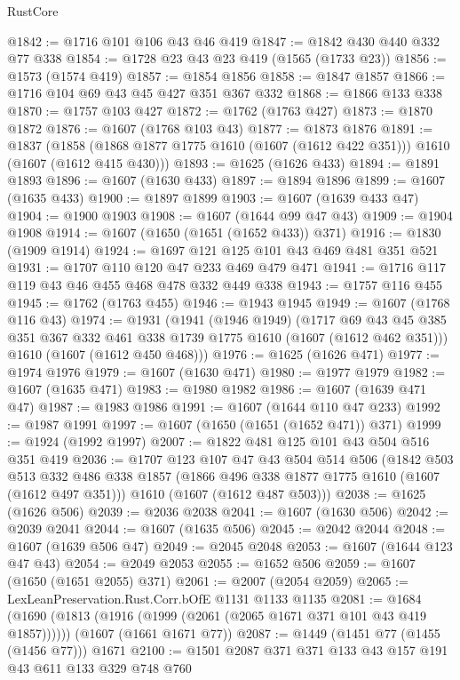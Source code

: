 \begin{lexlean}{RustCore}
\begin{coremodule}
@1842 := @1716 @101 @106 @43 @46 @419
@1847 := @1842 @430 @440 @332 @77 @338
@1854 := @1728 @23 @43 @23 @419 (@1565 (@1733 @23))
@1856 := @1573 (@1574 @419)
@1857 := @1854 @1856
@1858 := @1847 @1857
@1866 := @1716 @104 @69 @43 @45 @427 @351 @367 @332
@1868 := @1866 @133 @338
@1870 := @1757 @103 @427
@1872 := @1762 (@1763 @427)
@1873 := @1870 @1872
@1876 := @1607 (@1768 @103 @43)
@1877 := @1873 @1876
@1891 := @1837
    (@1858 (@1868 @1877 @1775 @1610 (@1607 (@1612 @422 @351))) @1610 (@1607 (@1612 @415 @430)))
@1893 := @1625 (@1626 @433)
@1894 := @1891 @1893
@1896 := @1607 (@1630 @433)
@1897 := @1894 @1896
@1899 := @1607 (@1635 @433)
@1900 := @1897 @1899
@1903 := @1607 (@1639 @433 @47)
@1904 := @1900 @1903
@1908 := @1607 (@1644 @99 @47 @43)
@1909 := @1904 @1908
@1914 := @1607 (@1650 (@1651 (@1652 @433)) @371)
@1916 := @1830 (@1909 @1914)
@1924 := @1697 @121 @125 @101 @43 @469 @481 @351 @521
@1931 := @1707 @110 @120 @47 @233 @469 @479 @471
@1941 := @1716 @117 @119 @43 @46 @455 @468 @478 @332 @449 @338
@1943 := @1757 @116 @455
@1945 := @1762 (@1763 @455)
@1946 := @1943 @1945
@1949 := @1607 (@1768 @116 @43)
@1974 := @1931
    (@1941
      (@1946 @1949)
      (@1717 @69 @43 @45 @385 @351 @367 @332 @461 @338 @1739 @1775 @1610 (@1607 (@1612 @462 @351)))
      @1610
      (@1607 (@1612 @450 @468)))
@1976 := @1625 (@1626 @471)
@1977 := @1974 @1976
@1979 := @1607 (@1630 @471)
@1980 := @1977 @1979
@1982 := @1607 (@1635 @471)
@1983 := @1980 @1982
@1986 := @1607 (@1639 @471 @47)
@1987 := @1983 @1986
@1991 := @1607 (@1644 @110 @47 @233)
@1992 := @1987 @1991
@1997 := @1607 (@1650 (@1651 (@1652 @471)) @371)
@1999 := @1924 (@1992 @1997)
@2007 := @1822 @481 @125 @101 @43 @504 @516 @351 @419
@2036 := @1707
    @123
    @107
    @47
    @43
    @504
    @514
    @506
    (@1842
      @503
      @513
      @332
      @486
      @338
      @1857
      (@1866 @496 @338 @1877 @1775 @1610 (@1607 (@1612 @497 @351)))
      @1610
      (@1607 (@1612 @487 @503)))
@2038 := @1625 (@1626 @506)
@2039 := @2036 @2038
@2041 := @1607 (@1630 @506)
@2042 := @2039 @2041
@2044 := @1607 (@1635 @506)
@2045 := @2042 @2044
@2048 := @1607 (@1639 @506 @47)
@2049 := @2045 @2048
@2053 := @1607 (@1644 @123 @47 @43)
@2054 := @2049 @2053
@2055 := @1652 @506
@2059 := @1607 (@1650 (@1651 @2055) @371)
@2061 := @2007 (@2054 @2059)
@2065 := LexLeanPreservation.Rust.Corr.bOfE @1131 @1133 @1135
@2081 := @1684
    (@1690 (@1813 (@1916 (@1999 (@2061 (@2065 @1671 @371 @101 @43 @419 @1857))))))
    (@1607 (@1661 @1671 @77))
@2087 := @1449 (@1451 @77 (@1455 (@1456 @77))) @1671
@2100 := @1501 @2087 @371 @371 @133 @43 @157 @191 @43 @611 @133 @329 @748 @760

\end{coremodule}
\end{lexlean}

